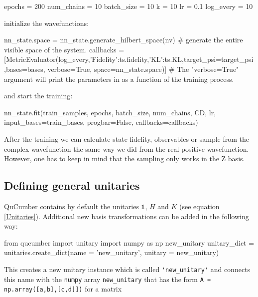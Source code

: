 \documentclass[submission, Phys]{SciPost}
\begin{document}
\begin{python}
	epochs   = 200
	num_chains = 10
	batch_size = 10
	k     = 10
	lr     = 0.1
	log_every = 10
\end{python}

initialize the wavefunctions:

\begin{python}
nn_state.space = nn_state.generate_hilbert_space(nv) # generate the entire visible space of the system.
callbacks      = [MetricEvaluator(log_every,{'Fidelity':ts.fidelity,'KL':ts.KL},target_psi=target_psi,bases=bases,
                                  verbose=True, space=nn_state.space)]
# The "verbose=True" argument will print the parameters in { } as a function of the training process.
\end{python}

and start the training:

\begin{python}
nn_state.fit(train_samples, epochs, batch_size, num_chains, CD,
       lr, input_bases=train_bases, progbar=False, callbacks=callbacks)
\end{python}

After the training we can calculate state fidelity, observables or sample from the complex wavefunction
the same way we did from the real-positive wavefunction. However, one has to keep in mind that the sampling only works in the Z basis.

\subsection{Defining general unitaries}

QuCumber contains by default the unitaries $\mathds{1}$, $H$ and $K$ (see equation \ref{Unitaries}).
Additional new basis transformations can be added in the following way:
\begin{python}
	from qucumber import unitary
	import numpy as np
	new_unitary
	unitary_dict = unitaries.create_dict(name = 'new_unitary', unitary = new_unitary)
\end{python}
This creates a new unitary instance which is called \verb|'new_unitary'| and connects this name with the \verb|numpy| array
\verb|new_unitary| that has the form \verb|A = np.array([a,b],[c,d]])| for a matrix
\end{document}
